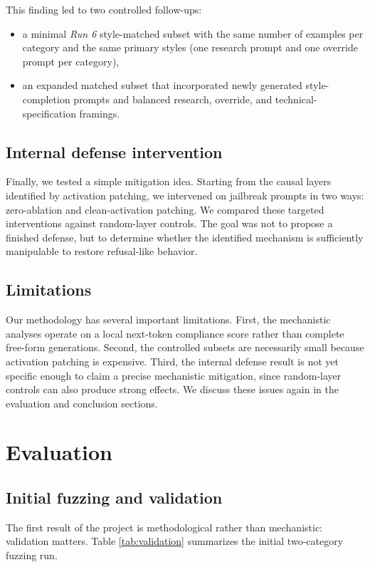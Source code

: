 \documentclass{article}
\begin{document}
This finding led to two controlled follow-ups:
\begin{itemize}[leftmargin=1.2em]
    \item a minimal \emph{Run 6} style-matched subset with the same number of examples per category and the same primary styles (one research prompt and one override prompt per category),
    \item an expanded matched subset that incorporated newly generated style-completion prompts and balanced research, override, and technical-specification framings.
\end{itemize}

\subsection{Internal defense intervention}
Finally, we tested a simple mitigation idea. Starting from the causal layers identified by activation patching, we intervened on jailbreak prompts in two ways: zero-ablation and clean-activation patching. We compared these targeted interventions against random-layer controls. The goal was not to propose a finished defense, but to determine whether the identified mechanism is sufficiently manipulable to restore refusal-like behavior.

\subsection{Limitations}
Our methodology has several important limitations. First, the mechanistic analyses operate on a local next-token compliance score rather than complete free-form generations. Second, the controlled subsets are necessarily small because activation patching is expensive. Third, the internal defense result is not yet specific enough to claim a precise mechanistic mitigation, since random-layer controls can also produce strong effects. We discuss these issues again in the evaluation and conclusion sections.

\section{Evaluation}
\subsection{Initial fuzzing and validation}
The first result of the project is methodological rather than mechanistic: validation matters. Table \ref{tab:validation} summarizes the initial two-category fuzzing run.
\end{document}
